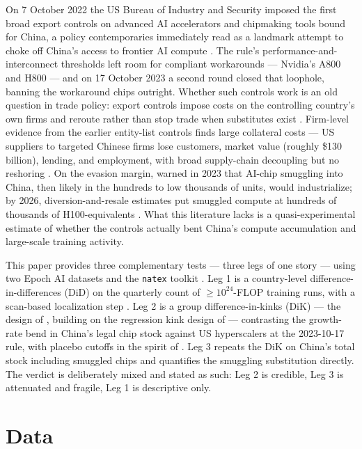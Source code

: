 \documentclass[11pt]{article}
\newcommand{\natex}{\texttt{natex}}
\begin{document}
On 7 October 2022 the US Bureau of Industry and Security imposed the first
broad export controls on advanced AI accelerators and chipmaking tools bound
for China, a policy contemporaries immediately read as a landmark attempt to
choke off China's access to frontier AI compute \cite{allen2022}. The rule's
performance-and-interconnect thresholds left room for compliant workarounds
--- Nvidia's A800 and H800 --- and on 17 October 2023 a second round closed
that loophole, banning the workaround chips outright. Whether such controls
work is an old question in trade policy: export controls impose costs on the
controlling country's own firms and reroute rather than stop trade when
substitutes exist \cite{bown2020,miller2022}. Firm-level evidence from the
earlier entity-list controls finds large collateral costs --- US suppliers to
targeted Chinese firms lose customers, market value (roughly \$130 billion),
lending, and employment, with broad supply-chain decoupling but no reshoring
\cite{crosignani2025}. On the evasion margin, \cite{fist2023} warned in 2023
that AI-chip smuggling into China, then likely in the hundreds to low
thousands of units, would industrialize; by 2026, diversion-and-resale
estimates put smuggled compute at hundreds of thousands of H100-equivalents
\cite{juniewicz2026}. What this literature lacks is a quasi-experimental
estimate of whether the controls actually bent China's compute accumulation
and large-scale training activity.

This paper provides three complementary tests --- three legs of one story ---
using two Epoch AI datasets \cite{epochmodels,epochchips} and the \natex{}
toolkit \cite{natex}. Leg 1 is a country-level difference-in-differences (DiD)
on the quarterly count of $\geq 10^{24}$-FLOP training runs, with a scan-based
localization step \cite{herlands2018}. Leg 2 is a group difference-in-kinks
(DiK) --- the design of \cite{bockerman2025}, building on the regression kink
design of \cite{card2015} --- contrasting the growth-rate bend in China's
legal chip stock against US hyperscalers at the 2023-10-17 rule, with placebo
cutoffs in the spirit of \cite{ganong2018}. Leg 3 repeats the DiK on China's
total stock including smuggled chips and quantifies the smuggling
substitution directly. The verdict is deliberately mixed and stated as such:
Leg 2 is credible, Leg 3 is attenuated and fragile, Leg 1 is descriptive
only.

\section{Data}\label{sec:data}
\end{document}
